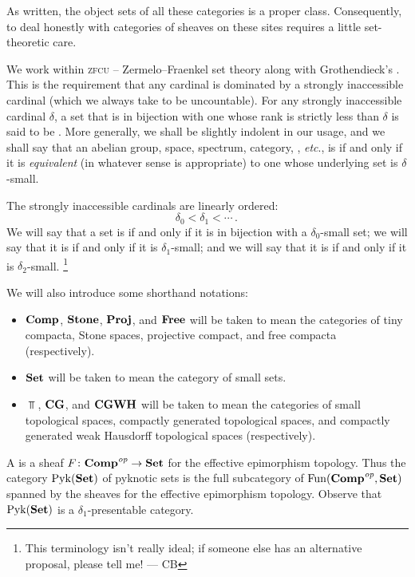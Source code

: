 \begin{wrn}
	As written, the object sets of all these categories is a proper class.
	Consequently, to deal honestly with categories of sheaves on these sites requires a little set-theoretic care.

	We work within \textsc{zfcu} -- Zermelo--Fraenkel set theory along with Grothendieck's .
	This is the requirement that any cardinal is dominated by a strongly inaccessible cardinal (which we always take to be uncountable).
	For any strongly inaccessible cardinal $ \delta $, a set that is in bijection with one whose rank is strictly less than $ \delta $ is said to be .
	More generally, we shall be slightly indolent in our usage, and we shall say that an abelian group, space, spectrum, category, \category, \emph{etc}., is  if and only if it is \emph{equivalent} (in whatever sense is appropriate) to one whose underlying set is $ \delta $-small.

	The strongly inaccessible cardinals are linearly ordered:
	\[
		\delta_0 < \delta_1 < \cdots \period
	\]
	We will say that a set is  if and only if it is in bijection with a $ \delta_0 $-small set;
	we will say that it is  if and only if it is $ \delta_1 $-small;
	and we will say that it is  if and only if it is $ \delta_2 $-small.%
	\footnote{This terminology isn't really ideal;
	if someone else has an alternative proposal, please tell me! --- CB}

	We will also introduce some shorthand notations:
	\begin{itemize}
		\item $ \textbf{\textup{Comp}} $, $ \textbf{\textup{Stone}} $, $ \textbf{\textup{Proj}} $, and $ \textbf{\textup{Free}} $ will be taken to mean the categories of tiny compacta, Stone spaces, projective compact, and free compacta (respectively).
		\item $ \textbf{\textup{Set}} $ will be taken to mean the category of small sets.
		\item $ \Top $, $ \textbf{\textup{CG}} $, and $ \textbf{\textup{CGWH}} $ will be taken to mean the categories of small topological spaces, compactly generated topological spaces, and compactly generated weak Hausdorff topological spaces (respectively).
	\end{itemize}
\end{wrn}

\begin{dfn}
	A  is a sheaf $ F \colon \textbf{\textup{Comp}}^{\textit{op}} \to \textbf{\textup{Set}} $ for the effective epimorphism topology.
	Thus the category $ \operatorname{Pyk}(\textbf{\textup{Set}}) $ of pyknotic sets is the full subcategory of $ \operatorname{Fun}(\textbf{\textup{Comp}}^{\textit{op}}, \textbf{\textup{Set}}) $ spanned by the sheaves for the effective epimorphism topology.
	Observe that $ \operatorname{Pyk}(\textbf{\textup{Set}}) $ is a $ \delta_1 $-presentable category.
\end{dfn}

